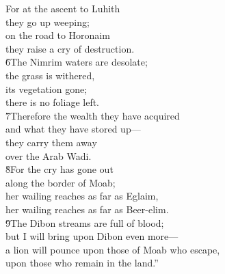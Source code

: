 \begin{poetry}
\poeml For at the ascent to Luhith \\
\poemll    they go up weeping; \\
\poeml on the road to Horonaim \\
\poemll    they raise a cry of destruction. \\
\poeml \v{6}The Nimrim waters are desolate; \\
\poemll    the grass is withered, \\
\poeml its vegetation gone; \\
\poemlll       there is no foliage left. \\
\poeml \v{7}Therefore the wealth they have acquired \\
\poemll    and what they have stored up--- \\
\poeml they carry them away \\
\poemll    over the Arab Wadi. \\
\poeml \v{8}For the cry has gone out \\
\poemll    along the border of Moab; \\
\poeml her wailing reaches as far as Eglaim, \\
\poemll    her wailing reaches as far as Beer-elim. \\
\poeml \v{9}The Dibon streams are full of blood; \\
\poemll    but I will bring upon Dibon even more--- \\
\poeml a lion will pounce upon those of Moab who escape, \\
\poeml upon those who remain in the land.''
\end{poetry}


